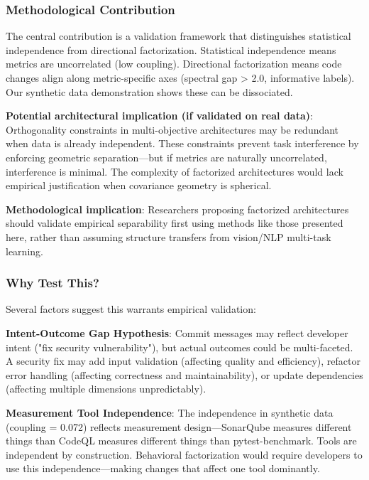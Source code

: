 
\subsubsection{Methodological Contribution}

The central contribution is a validation framework that distinguishes statistical independence from directional factorization. Statistical independence means metrics are uncorrelated (low coupling). Directional factorization means code changes align along metric-specific axes (spectral gap > 2.0, informative labels). Our synthetic data demonstration shows these can be dissociated.

\textbf{Potential architectural implication (if validated on real data)}: Orthogonality constraints in multi-objective architectures may be redundant when data is already independent. These constraints prevent task interference by enforcing geometric separation—but if metrics are naturally uncorrelated, interference is minimal. The complexity of factorized architectures would lack empirical justification when covariance geometry is spherical.

\textbf{Methodological implication}: Researchers proposing factorized architectures should validate empirical separability first using methods like those presented here, rather than assuming structure transfers from vision/NLP multi-task learning.

\subsubsection{Why Test This?}

Several factors suggest this warrants empirical validation:

\textbf{Intent-Outcome Gap Hypothesis}: Commit messages may reflect developer intent ("fix security vulnerability"), but actual outcomes could be multi-faceted. A security fix may add input validation (affecting quality and efficiency), refactor error handling (affecting correctness and maintainability), or update dependencies (affecting multiple dimensions unpredictably).

\textbf{Measurement Tool Independence}: The independence in synthetic data (coupling = 0.072) reflects measurement design—SonarQube measures different things than CodeQL measures different things than pytest-benchmark. Tools are independent by construction. Behavioral factorization would require developers to use this independence—making changes that affect one tool dominantly.

